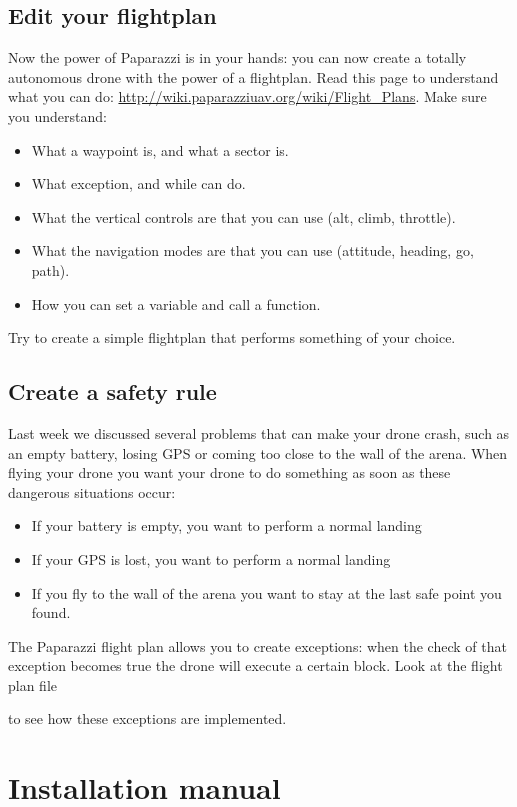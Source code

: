 \documentclass{article}
\begin{document}
\subsection*{Edit your flightplan}
Now the power of Paparazzi is in your hands: you can now create a totally autonomous drone with the power of a flightplan. Read this page to understand what you can do: \url{http://wiki.paparazziuav.org/wiki/Flight_Plans}. 
Make sure you understand:
\begin{itemize}
	\item What a waypoint is, and what a sector is. 
	\item What exception, and while can do. 
	\item What the vertical controls are that you can use (alt, climb, throttle).
	\item What the navigation modes are that you can use (attitude, heading, go, path). 
	\item How you can set a variable and call a function. 
\end{itemize}

Try to create a simple flightplan that performs something of your choice. 

\subsection*{Create a safety rule}
Last week we discussed several problems that can make your drone crash, such as an empty battery, losing GPS or coming too close to the wall of the arena.
When flying your drone you want your drone to do something as soon as these dangerous situations occur:
\begin{itemize}
\item If your battery is empty, you want to perform a normal landing
\item If your GPS is lost, you want to perform a normal landing
\item If you fly to the wall of the arena you want to stay at the last safe point you found. 
\end{itemize}
The Paparazzi flight plan allows you to create exceptions: when the check of that exception becomes true the drone will execute a certain block. Look at the flight plan file 

 to see how these exceptions are implemented. 

\clearpage
\section*{Installation manual}
\end{document}
